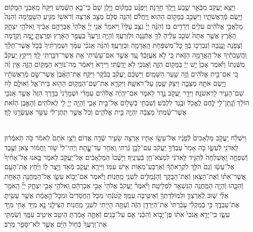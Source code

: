 \documentclass[twoside, openany, parskip=half, 11pt]{book}
\begin{document}
\begin{footnotesize}
\begin{multicols}{2}
\\
וַיֵּצֵ֥א יַֽעֲקֹ֖ב מִבְּֿאֵ֣ר שָׁ֑בַע וַיֵּ֖לֶךְ חָרָֽנָה׃ וַיִּפְגַּ֨ע בַּמָּק֜וֹם וַיָּ֤לֶן שָׁם֙ כִּי־בָ֣א הַשֶּׁ֔מֶשׁ וַיִּקַּח֙ מֵֽאַבְנֵ֣י הַמָּק֔וֹם וַיָּ֖שֶׂם מְֿרַֽאֲשֹׁתָ֑יו וַיִּשְׁכַּ֖ב בַּמָּק֥וֹם הַהֽוּא׃ וַֽיַּֽחֲלֹ֗ם וְֿהִנֵּ֤ה סֻלָּם֙ מֻצָּ֣ב אַ֔רְצָה וְֿרֹאשׁ֖וֹ מַגִּ֣יעַ הַשָּׁמָ֑יְֿמָה וְֿהִנֵּה֙ מַלְאֲכֵ֣י אֱלֹהִ֔ים עֹלִ֥ים וְֿיֹֽרְֿדִ֖ים בּֽוֹ׃  וְֿהִנֵּ֨ה יְיָ֜ נִצָּ֣ב עָלָיו֘ וַיֹּאמַר֒ אֲנִ֣י יְיָ֗ אֱלֹהֵי֙ אַבְרָהָ֣ם אָבִ֔יךָ וֵֽאלֹהֵ֖י יִצְחָ֑ק הָאָ֗רֶץ אֲשֶׁ֤ר אַתָּה֙ שֹׁכֵ֣ב עָלֶ֔יהָ לְֿךָ֥ אֶתְּֿנֶ֖נָּה וּלְזַרְעֶֽךָ׃ וְֿהָיָ֤ה זַֽרְעֲךָ֙ כַּֽעֲפַ֣ר הָאָ֔רֶץ וּפָֽרַצְתָּ֛ יׇׇׇָ֥מָּה וָקֵ֖דְֿמָה וְֿצָפֹ֣נָה וָנֶ֑גְבָּה וְֿנִבְרְכ֥וּ בְֿךָ֛ כׇּל־מִשְׁפְּֿחֹ֥ת הָֽאֲדָמָ֖ה וּבְזַרְעֶֽךָ׃ וְֿהִנֵּ֨ה אָֽנֹכִ֜י עִמָּ֗ךְ וּשְׁמַרְתִּ֨יךָ֙ בְּֿכֹ֣ל אֲשֶׁר־תֵּלֵ֔ךְ וַֽהֲשִׁ֣בֹתִ֔יךָ אֶל־הָֽאֲדָמָ֖ה הַזֹּ֑את כִּ֚י לֹ֣א אֶֽעֱזָבְֿךָ֔ עַ֚ד אֲשֶׁ֣ר אִם־עָשִׂ֔יתִי אֵ֥ת אֲשֶׁר־דִּבַּ֖רְתִּי לָֽךְ׃ וַיִּיקַ֣ץ יַֽעֲקֹב֘ מִשְּֿׁנָתוֹ֒ וַיֹּ֗אמֶר אָכֵן֙ יֵ֣שׁ יְיָ֔ בַּמָּק֖וֹם הַזֶּ֑ה וְֿאָֽנֹכִ֖י לֹ֥א יָדָֽעְֿתִּי׃ וַיִּירָא֙ וַיֹּאמַ֔ר מַה־נּוֹרָ֖א הַמָּק֣וֹם הַזֶּ֑ה אֵ֣ין זֶ֗ה כִּ֚י אִם־בֵּ֣ית אֱלֹהִ֔ים וְֿזֶ֖ה שַׁ֥עַר הַשָּׁמָֽיִם׃  וַיַּשְׁכֵּ֨ם יַֽעֲקֹ֜ב בַּבֹּ֗קֶר וַיִּקַּ֤ח אֶת־הָאֶ֨בֶן֙ אֲשֶׁר־שָׂ֣ם מְֿרַֽאֲשֹׁתָ֔יו וַיָּ֥שֶׂם אֹתָ֖הּ מַצֵּבָ֑ה וַיִּצֹ֥ק שֶׁ֖מֶן עַל־רֹאשָֽׁהּ׃ וַיִּקְרָ֛א אֶת־שֵׁם־הַמָּק֥וֹם הַה֖וּא בֵּית־אֵ֑ל וְֿאוּלָ֛ם ל֥וּז שֵׁם־הָעִ֖יר לָרִֽאשֹׁנָֽה׃ וַיִּדַּ֥ר יַֽעֲקֹ֖ב נֶ֣דֶר לֵאמֹ֑ר אִם־יִֽהְיֶ֨ה אֱלֹהִ֜ים עִמָּדִ֗י וּשְׁמָרַ֨נִי֙ בַּדֶּ֤רֶךְ הַזֶּה֙ אֲשֶׁ֣ר אָֽנֹכִ֣י הוֹלֵ֔ךְ וְֿנָֽתַן־לִ֥י לֶ֛חֶם לֶֽאֱכֹ֖ל וּבֶ֥גֶד לִלְבֹּֽשׁ׃ וְֿשַׁבְתִּ֥י בְֿשָׁל֖וֹם אֶל־בֵּ֣ית אָבִ֑י וְֿהָיָ֧ה יְיָ֛ לִ֖י לֵֽאלֹהִֽים׃ וְֿהָאֶ֣בֶן הַזֹּ֗את אֲשֶׁר־שַׂ֨מְתִּי֙ מַצֵּבָ֔ה יִֽהְיֶ֖ה בֵּ֣ית אֱלֹהִ֑ים וְֿכֹל֙ אֲשֶׁ֣ר תִּֽתֶּן־לִ֔י עַשֵּׂ֖ר אֲעַשְּֿׂרֶ֥נּוּ לָֽךְ׃

\\
וַיִּשְׁלַ֨ח יַֽעֲקֹ֤ב מַלְאָכִים֙ לְֿפָנָ֔יו אֶל־עֵשָׂ֖ו אָחִ֑יו אַ֥רְצָה שֵׂעִ֖יר שְֿׂדֵ֥ה אֱדֽוֹם׃ וַיְֿצַ֤ו אֹתָם֙ לֵאמֹ֔ר כֹּ֣ה תֹֽאמְֿר֔וּן לַֽאדֹנִ֖י לְֿעֵשָׂ֑ו כֹּ֤ה אָמַר֙ עַבְדְּֿךָ֣ יַֽעֲקֹ֔ב עִם־לָבָ֣ן גַּ֔רְתִּי וָֽאֵחַ֖ר עַד־עׇׇׇׇָֽתָּה׃ וַֽיְֿהִי־לִי֙ שׁ֣וֹר וַֽחֲמ֔וֹר צֹ֖אן וְֿעֶ֣בֶד וְֿשִׁפְחָ֑ה וָֽאֶשְׁלְחָה֙ לְֿהַגִּ֣יד לַֽאדֹנִ֔י לִמְצֹא־חֵ֖ן בְּֿעֵינֶֽיךָ׃  וַיָּשֻׁ֨בוּ֙ הַמַּלְאָכִ֔ים אֶל־יַֽעֲקֹ֖ב לֵאמֹ֑ר בָּ֤אנוּ אֶל־אָחִ֨יךָ֙ אֶל־עֵשָׂ֔ו וְֿגַם֙ הֹלֵ֣ךְ לִקְרָֽאתְֿךָ֔ וְֿאַרְבַּע־מֵא֥וֹת אִ֖ישׁ עִמּֽוֹ׃ וַיִּירָ֧א יַֽעֲקֹ֛ב מְֿאֹ֖ד וַיֵּ֣צֶר ל֑וֹ וַיַּ֜חַץ אֶת־הָעָ֣ם אֲשֶׁר־אִתּ֗וֹ וְֿאֶת־הַצֹּ֧אן וְֿאֶת־הַבָּקָ֛ר וְֿהַגְּֿמַלִּ֖ים לִשְׁנֵ֥י מַֽחֲנֽוֹת׃ וַיֹּ֕אמֶר אִם־יָב֥וֹא עֵשָׂ֛ו אֶל־הַמַּֽחֲנֶ֥ה הָאַחַ֖ת וְֿהִכָּ֑הוּ וְֿהָיָ֛ה הַמַּֽחֲנֶ֥ה הַנִּשְׁאָ֖ר לִפְלֵיטָֽה׃  וַיֹּ֘אמֶר֘ יַֽעֲקֹב֒ אֱלֹהֵי֙ אָבִ֣י אַבְרָהָ֔ם וֵֽאלֹהֵ֖י אָבִ֣י יִצְחָ֑ק יְיָ֞ הָֽאֹמֵ֣ר אֵלַ֗י שׁ֧וּב לְֿאַרְצְךָ֛ וּלְמֽוֹלַדְתְּךָ֖ וְֿאֵיטִ֥יבָה עִמָּֽךְ׃ קָטֹ֝נְֿתִּי מִכֹּ֤ל הַֽחֲסָדִים֙ וּמִכׇּל־הָ֣אֱמֶ֔ת אֲשֶׁ֥ר עָשִׂ֖יתָ אֶת־עַבְדֶּ֑ךָ כִּ֣י בְֿמַקְלִ֗י עָבַ֨רְתִּי֙ אֶת־הַיַּרְדֵּ֣ן הַזֶּ֔ה וְֿעַתָּ֥ה הָיִ֖יתִי לִשְׁנֵ֥י מַֽחֲנֽוֹת׃ הַצִּילֵ֥נִי נָ֛א מִיַּ֥ד אָחִ֖י מִיַּ֣ד עֵשָׂ֑ו כִּֽי־יָרֵ֤א אָֽנֹכִי֙ אֹת֔וֹ פֶּן־יָב֣וֹא וְֿהִכַּ֔נִי אֵ֖ם עַל־בָּנִֽים׃ וְֿאַתָּ֣ה אָמַ֔רְתָּ הֵיטֵ֥ב אֵיטִ֖יב עִמָּ֑ךְ וְֿשַׂמְתִּ֤י אֶת־זַֽרְעֲךָ֙ כְּֿח֣וֹל הַיָּ֔ם אֲשֶׁ֥ר לֹֽא־יִסָּפֵ֖ר מֵרֹֽב׃



\end{multicols}
\end{footnotesize}
\end{document}
